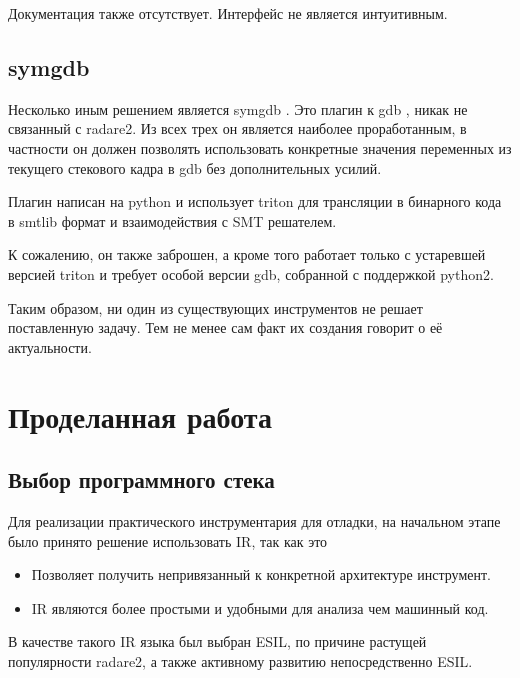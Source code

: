 Документация также отсутствует. Интерфейс не является интуитивным.



\subsection{symgdb}

Несколько иным решением является symgdb \cite{symgdb}. Это плагин к gdb \cite{gdb}, никак не связанный с radare2. Из всех трех он является наиболее проработанным, в частности он должен позволять использовать конкретные значения переменных из текущего стекового кадра в gdb без дополнительных усилий.

Плагин написан на python и использует triton для трансляции в бинарного кода
в smtlib формат и взаимодействия с SMT решателем.

К сожалению, он также заброшен, а кроме того работает только с устаревшей версией triton и требует особой версии gdb, собранной с поддержкой python2.

Таким образом, ни один из существующих инструментов не решает поставленную задачу. Тем не менее сам факт их создания говорит о её актуальности.

\section{Проделанная работа}

\subsection{Выбор программного стека}

Для реализации практического инструментария для отладки, на начальном этапе было принято решение использовать IR, так как это 


\begin{itemize}
\item Позволяет получить непривязанный к конкретной архитектуре инструмент.

\item IR являются более простыми и удобными для анализа чем машинный код.

\end{itemize}

В качестве такого IR языка был выбран ESIL, по причине растущей популярности radare2, а также активному развитию непосредственно ESIL.

